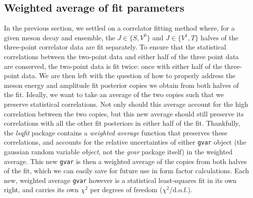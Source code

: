 

\subsection{Weighted average of fit parameters}\label{sec:wavg_fit_params}
In the previous section, we settled on a correlator fitting method where, for a given meson decay and ensemble, the $J\in\{S,V^0\}$ and $J\in\{V^1,T\}$ halves of the three-point correlator data are fit separately.  To ensure that the statistical correlations between the two-point data and either half of the three point data are conserved, the two-point data is fit twice: once with either half of the three-point data.  We are then left with the question of how to properly address the meson energy and amplitude fit posterior copies we obtain from both halves of the fit.  %
Ideally, we want to take an average of the two copies such that we preserve statistical correlations.  Not only should this average account for the high correlation between the two copies, but this new average should still preserve its correlations with all the other fit posteriors in either half of the fit.  Thankfully, the \textit{lsqfit} package contains a \textit{weighted average} function that preserves these correlations, and accounts for the relative uncertainties of either \verb|gvar| object (the gaussian random variable \textit{object}, not the \textit{gvar} package itself) in the weighted average.  This new \verb|gvar| is then a weighted average of the copies from both halves of the fit, which we can easily save for future use in form factor calculations.  Each new, weighted average \verb|gvar| however is a statistical least-squares fit in its own right, and carries its own $\chi^2$ per degrees of freedom ($\chi^2/\mathrm{d.o.f.}$). 

